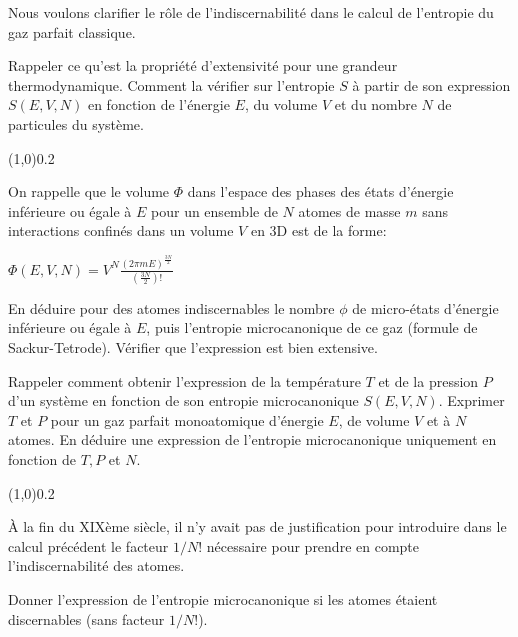 Nous voulons clarifier le rôle de l’indiscernabilité dans le calcul de l’entropie du gaz parfait classique.

\question Rappeler ce qu'est la propriété d’extensivité pour une grandeur thermodynamique. Comment la vérifier sur l'entropie $S$ à partir de son expression $S(E,V,N)$ en fonction de l'énergie $E$, du volume $V$ et du nombre $N$ de particules du système. 


\begin{center} \vspace{-0.5cm}\line(1,0){0.2\textwidth} \vspace{-0.5cm}\end{center}

On rappelle que  le volume $\Phi$ dans l'espace des phases des états d'énergie inférieure ou égale à $E$ pour un ensemble de $N$ atomes de masse $m$ sans interactions confinés dans un volume $V$ en 3D est de la forme:
\begin{center}
$\Phi(E,V,N)=V^N \frac{(2\pi m E)^\frac{3N}{2}}{(\frac{3N}{2})!}$    
\end{center}

\question En déduire pour des atomes indiscernables le nombre $\phi$ de micro-états d'énergie inférieure ou égale à $E$, puis l'entropie microcanonique de ce gaz (formule de Sackur-Tetrode). Vérifier que l'expression est bien extensive.

\question Rappeler comment obtenir l'expression de la température $T$ et de la pression $P$ d'un système en fonction de son entropie microcanonique $S(E, V, N)$.
Exprimer $T$ et $P$ pour un gaz parfait monoatomique d'énergie $E$, de volume $V$ et à $N$ atomes.
\question En déduire une expression de l'entropie microcanonique uniquement en fonction de $T, P$ et $N$.


\begin{center} \vspace{-0.5cm}\line(1,0){0.2\textwidth} \vspace{-0.5cm}\end{center}

\`A la fin du XIXème siècle, il n’y avait pas de justification pour introduire dans le calcul précédent le facteur $1/N!$  nécessaire pour prendre en compte l’indiscernabilité des atomes. 

\question Donner l’expression de l’entropie microcanonique si les atomes étaient discernables (sans facteur $1/N!$).

